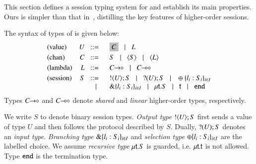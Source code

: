 \noi %
This section defines 
a session typing system for
\HOp and establish its main properties. 
Ours is simpler than that in~\cite{tlca07,MostrousY15}, distilling the key
features of higher-order sessions. %

\smallskip 

The syntax of types of \HOp is given below: 
\[
\begin{array}{lrl}
\text{(value)}	& U \bnfis &	\nonhosyntax{C} \bnfbar L\\[1mm]  %
\text{(chan)}   & C  \bnfis &	S \bnfbar \chtype{S}\bnfbar \chtype{L}
	\\[1mm]
\text{(lambda)} & L \bnfis &	\shot{C} \bnfbar \lhot{C}
	\\[1mm]
\text{(session)} &  S \bnfis & 	\btout{U} S \bnfbar \btinp{U} S 
\bnfbar \btsel{l_i:S_i}_{i \in I} \\ 
 & \bnfbar & \btbra{l_i:S_i}_{i \in I}
	  \bnfbar  \trec{t}{S} \bnfbar \vart{t}  \bnfbar \tinact
\end{array}
\]
Types $C\!\! \rightarrow\!\! \diamond$ and $C\!\! \multimap\!\! \diamond$ denote
{\em shared} and {\em linear} higher-order 
types, respectively.
 
We write $S$ to denote binary session types.  {\em Output type}
$! \langle U \rangle ; S$ %
first sends a value of
type $U$ and then follows the protocol described by $S$.  Dually,
$? (U) ; S$ denotes an {\em input type}.  {\em Branching type}
$\& \{l_i:S_i\}_{i \in I}$ and {\em selection type}
$\oplus \{l_i:S_i\}_{i \in I}$ are the labelled choice. 
We assume {\em recursive type} $\mu\mathsf{t}.S$ is guarded,
i.e.  $\mu\mathsf{t}.\mathsf{t}$ is not allowed. 
Type $\mathtt{end}$ is the termination type. 

